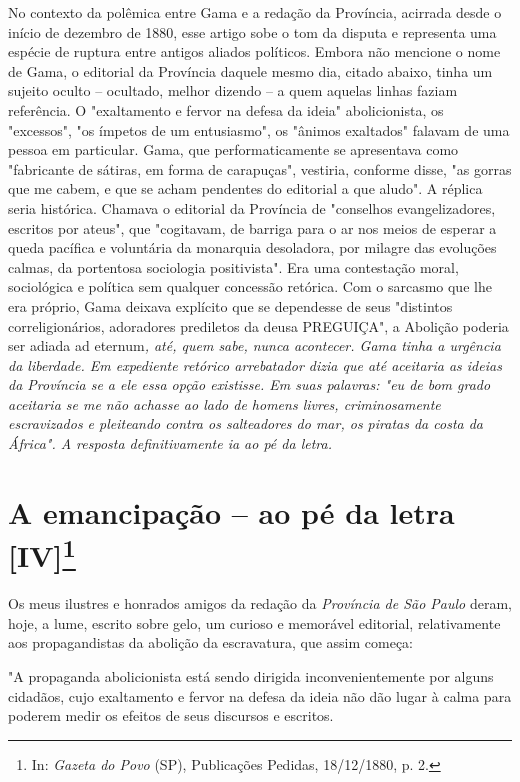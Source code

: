 {{\small\noindent
No contexto da polêmica entre Gama e a redação da Província,
acirrada desde o início de dezembro de 1880, esse artigo sobe o tom da
disputa e representa uma espécie de ruptura entre antigos aliados
políticos. Embora não mencione o nome de Gama, o editorial da Província
daquele mesmo dia, citado abaixo, tinha um sujeito oculto -- ocultado,
melhor dizendo -- a quem aquelas linhas faziam referência. O
"exaltamento e fervor na defesa da ideia" abolicionista, os "excessos",
"os ímpetos de um entusiasmo", os "ânimos exaltados" falavam de uma
pessoa em particular. Gama, que performaticamente se apresentava como
"fabricante de sátiras, em forma de carapuças", vestiria, conforme
disse, "as gorras que me cabem, e que se acham pendentes do editorial a
que aludo". A réplica seria histórica. Chamava o editorial da Província
de "conselhos evangelizadores, escritos por ateus", que "cogitavam, de
barriga para o ar nos meios de esperar a queda pacífica e voluntária da
monarquia desoladora, por milagre das evoluções calmas, da portentosa
sociologia positivista". Era uma contestação moral, sociológica e
política sem qualquer concessão retórica. Com o sarcasmo que lhe era
próprio, Gama deixava explícito que se dependesse de seus "distintos
correligionários, adoradores prediletos da deusa PREGUIÇA", a Abolição
poderia ser adiada} ad eternum\emph{, até, quem sabe, nunca acontecer.
Gama tinha a urgência da liberdade. Em expediente retórico arrebatador
dizia que até aceitaria as ideias da Província se a ele essa opção
existisse. Em suas palavras: "eu de bom grado aceitaria se me não
achasse ao lado de homens livres, criminosamente escravizados e
pleiteando contra os salteadores do mar, os piratas da costa da África".
A resposta definitivamente ia ao pé da letra. }

\chapter{A emancipação -- ao pé da letra {[}IV{]}\footnote[*]{
  In: \emph{Gazeta do Povo} (SP), Publicações Pedidas, 18/12/1880, p. 2.}}


Os meus ilustres e honrados amigos da redação da \emph{Província de São
Paulo} deram, hoje, a lume, escrito sobre gelo, um curioso e memorável
editorial, relativamente aos propagandistas da abolição da escravatura,
que assim começa:

"A propaganda abolicionista está sendo dirigida inconvenientemente por
alguns cidadãos, cujo exaltamento e fervor na defesa da ideia não dão
lugar à calma para poderem medir os efeitos de seus discursos e
escritos.

}
